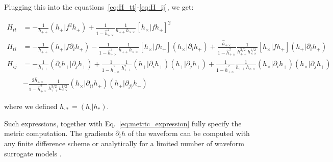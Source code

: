 \documentclass[twocolumn,showpacs,preprintnumbers,nofootinbib,prd,
superscriptaddress,10pt]{revtex4-2}
\newcommand{\rescalar}[2]{( #1 |#2 )}
\newcommand{\imscalar}[2]{[ #1|#2 ]}
\begin{document}
Plugging this into the equations~\eqref{eq:H_tt}-\eqref{eq:H_ij}, we get:
\begin{widetext}
\begin{align}
	H_{tt} &= - \frac{1}{h_{++}} \rescalar{h_+}{f^2 {h_+}}
		+ \frac{1}{1-\hat{h}^2_{+\times}} \frac{1}{h_{++}h_{\times\times}} \imscalar{{h_\times}}{f{h_+}}^2 \label{eq:H_tt_grad} \\
	H_{ti} &= - \frac{1}{h_{++}} \rescalar{h_+}{f \partial_i h_+}
		- \frac{1}{1-\hat{h}^2_{+\times}} \frac{1}{h_{++}h_{\times\times}} \imscalar{{h_\times}}{f{h_+}} \rescalar{{h_\times}}{\partial_i h_+}
		+ \frac{\hat{h}_{+\times}}{1-\hat{h}^2_{+\times}} \frac{1}{h^{3/2}_{++}h^{1/2}_{\times\times}}
			\imscalar{{h_\times}}{f{h_+}} \rescalar{{h_+}}{\partial_i h_+} \label{eq:H_ti_grad}\\
	H_{ij} &= - \frac{1}{h_{++}} \rescalar{\partial_i h_+}{\partial_j h_+}
		+ \frac{1}{1-\hat{h}^2_{+\times}} \frac{1}{h^2_{++}} \rescalar{h_+}{\partial_i {h_+}} \rescalar{{h_+}}{\partial_j {h_+}}
		+ \frac{1}{1-\hat{h}^2_{+\times}} \frac{1}{h_{++}h_{\times\times}} \rescalar{h_\times}{\partial_i {h_+}} \rescalar{{h_\times}}{\partial_j {h_+}} \nonumber \\
		& - \frac{2 \hat{h}_{+\times}}{1-\hat{h}^2_{+\times}} \frac{1}{h^{3/2}_{++}h^{1/2}_{\times\times}}
		\rescalar{h_\times}{\partial_{(i} {h_+}} \rescalar{{h_+}}{\partial_{j)} {h_+}} \label{eq:H_ij_grad}
%
%
%
\end{align}
\end{widetext}
where we defined $h_{\cdot*} = \rescalar{h_\cdot}{h_*}$.

Such expressions, together with Eq.~\eqref{eq:metric_expression} fully specify the metric computation.
The gradients $\partial_i h$ of the waveform can be computed with any finite difference scheme or analytically for a limited number of waveform surrogate models \cite{PhysRevD.103.043020, Khan:2020fso, Tissino:2022thn}.
\end{document}
